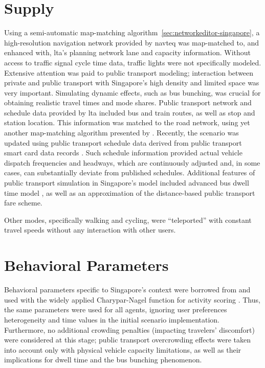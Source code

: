 \section{Supply}
Using a semi-automatic map-matching algorithm~\ref{sec:networkeditor-singapore}, a high-resolution navigation network provided by \gls{navteq} was map-matched to, and enhanced with, \gls{lta}'s planning network lane and capacity information. Without access to traffic signal cycle time data, traffic lights were not specifically modeled. Extensive attention was paid to public transport modeling; interaction between private and public transport with Singapore’s high density and limited space was very important. Simulating dynamic effects, such as bus bunching, was crucial for obtaining realistic travel times and mode shares. Public transport network and schedule data provided by \gls{lta} included bus and train routes, as well as stop and station location. This information was matched to the road network, using yet another map-matching algorithm presented by \citet[][]{Ordonez_HKSTS_2011, Ordonez_Webpage_2011_4}. Recently, the scenario was updated using public transport schedule data derived from public transport smart card data records \citet[][]{Fourie_TechRep_FCL_2014}. Such schedule information provided actual vehicle dispatch frequencies and headways, which are continuously adjusted and, in some cases, can substantially deviate from published schedules. Additional features of public transport simulation in Singapore’s model included advanced bus dwell time model \citep[][]{SunEtAl_TransResA_2014}, as well as an approximation of the distance-based public transport fare scheme.

Other modes, specifically walking and cycling, were ``\gls{teleported}'' with constant travel speeds without any interaction with other users. 

\section{Behavioral Parameters}
Behavioral parameters specific to Singapore's context were borrowed from \citet[][]{LTA_unpub_2009} and used with the widely applied Charypar-Nagel function for activity scoring \citet[][]{CharyparNagel2005ga4acts}. Thus, the same parameters were used for all agents, ignoring user preferences heterogeneity and time values in the initial scenario implementation. Furthermore, no additional crowding penalties (impacting travelers' discomfort) were considered at this stage; public transport overcrowding effects were taken into account only with physical vehicle capacity limitations, as well as their implications for dwell time and the bus bunching phenomenon. 

